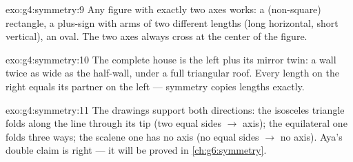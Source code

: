 \begin{solution}{exo:g4:symmetry:9}
Any figure with exactly two axes works: a (non-square) rectangle, a
plus-sign with arms of two different lengths (long horizontal, short
vertical), an oval. The two axes always cross at the center of the
figure.
\end{solution}

\begin{solution}{exo:g4:symmetry:10}
The complete house is the left  plus its mirror twin: a wall
twice as wide as the half-wall, under a full triangular roof. Every
length on the right equals its partner on the left --- symmetry
copies lengths exactly.
\end{solution}

\begin{solution}{exo:g4:symmetry:11}
The drawings support both directions: the isosceles triangle folds
along the line through its tip (two equal sides $\to$ axis); the
equilateral one folds three ways; the scalene one has no axis (no
equal sides $\to$ no axis). Aya's double claim is right --- it will
be proved in \cref{ch:g6:symmetry}.
\end{solution}

